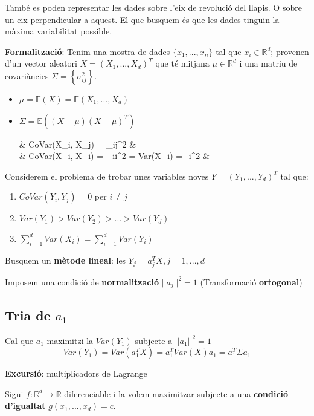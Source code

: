 \documentclass[a4paper]{article}
\begin{document}
	També es poden representar les dades sobre l'eix de revolució del llapis. O sobre un eix perpendicular a aquest. El que busquem és que les dades tinguin la màxima variabilitat possible.
	
	\textbf{Formalització}: Tenim una mostra de dades $\{x_1, ..., x_n\}$ tal que $x_i \in \mathbb{R}^d$; provenen d'un vector aleatori $X = (X_1, ..., X_d)^T$ que té mitjana $\mu \in \mathbb{R}^d$ i una matriu de covariàncies $\Sigma = \left\{ \sigma_{ij}^2 \right\}$.
	
	\begin{itemize}
		\item $\mu = \mathbb{E}(X) = \mathbb{E}(X_1, ..., X_d)$
		\item $\Sigma = \mathbb{E}\left((X - \mu)(X-\mu)^T\right)$
		
		\begin{flalign*}
		 & CoVar(X_i, X_j) = \sigma_{ij}^2  &\\
		 & CoVar(X_i, X_i) = \sigma_{ii}^2 = Var(X_i) =\sigma_i^2 &
		\end{flalign*}
	\end{itemize}
	
	Considerem el problema de trobar unes variables noves $Y = (Y_1, ..., Y_d)^T$ tal que:
	
	\begin{enumerate}
		\item $CoVar(Y_i, Y_j) = 0$ per $i \ne j$
		\item $Var(Y_1) > Var(Y_2) > ... > Var(Y_d)$
		\item $\sum_{i=1}^d Var(X_i) = \sum_{i=1}^d Var(Y_i)$
	\end{enumerate}
	
	Busquem un \textbf{mètode lineal}: les $Y_j = a_j^TX, j=1,...,d$
	
	Imposem una condició de \textbf{normalització} $||a_j||^2 = 1$ 
	(Transformació \textbf{ortogonal})
	
	\subsection{Tria de $a_1$}
	Cal que $a_1$ maximitzi la $Var(Y_1)$ subjecte a $||a_1||^2=1$
	$$ Var(Y_1) = Var(a_1^TX) = a_1^TVar(X)a_1 = a_1^T\Sigma a_1 $$
	
	\textbf{Excursió}: multiplicadors de Lagrange
	
	Sigui $f:\mathbb{R}^d \rightarrow \mathbb{R}$ diferenciable i la volem maximitzar subjecte a una \textbf{condició d'igualtat} $g(x_1, ..., x_d) = c$.
	
\end{document}

